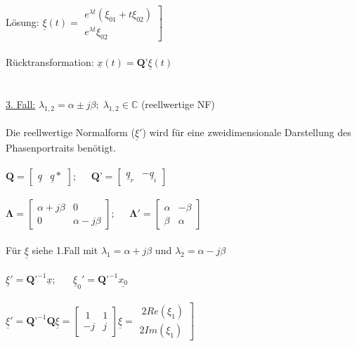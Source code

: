 \documentclass[a4paper,twocolumn,10pt]{article}
\begin{document}
Lösung: $\underline{\xi} (t)=\left.\begin{matrix}e^{\lambda t}(\xi_{01}+t\xi_{02}) \\ e^{\lambda t}\xi_{02}\end{matrix}\right]$\\\\
Rücktransformation: $\underline{x}(t)=\textbf{Q'}\underline{\xi} (t)$\\\\\\
\underline{3. Fall:} $\lambda_{1,2} =\alpha \pm j\beta;\;\lambda_{1,2}\in \mathbb{C}$ (reellwertige NF)\\\\
Die reellwertige Normalform ($\underline{\xi}'$) wird für eine zweidimensionale Darstellung des Phasenportraits benötigt.\\\\
$\textbf{Q}=\begin{bmatrix}\underline{q} & \underline{q}*\end{bmatrix};\;\;\;\;\;\textbf{Q'}=\begin{bmatrix}\underline{q}_r & -\underline{q}_i\end{bmatrix}$\\\\
$\mathbf{\Lambda} =\begin{bmatrix}\alpha +j\beta & 0 \\ 0 & \alpha -j\beta\end{bmatrix};\;\;\;\;\;\mathbf{\Lambda'} =\begin{bmatrix}\alpha & -\beta \\ \beta & \alpha\end{bmatrix}$\\\\
Für $\underline{\xi}$ siehe 1.Fall mit $\lambda_1 =\alpha +j\beta$ und $\lambda_2 = \alpha -j\beta$\\\\
$\underline{\xi}' =\textbf{Q'}^{-1}\underline{x};\;\;\;\;\;\;\underline{\xi}_0' =\textbf{Q'}^{-1}\underline{x_0}$\\\\
$\underline{\xi}'=\textbf{Q'}^{-1}\textbf{Q}\underline{\xi} =\begin{bmatrix}\ 1 & 1 \\ -j & j\end{bmatrix}\underline{\xi}=\left.\begin{matrix}\ 2Re(\xi_1) \\ 2Im(\xi_1)\end{matrix}\right]$
\end{document}
